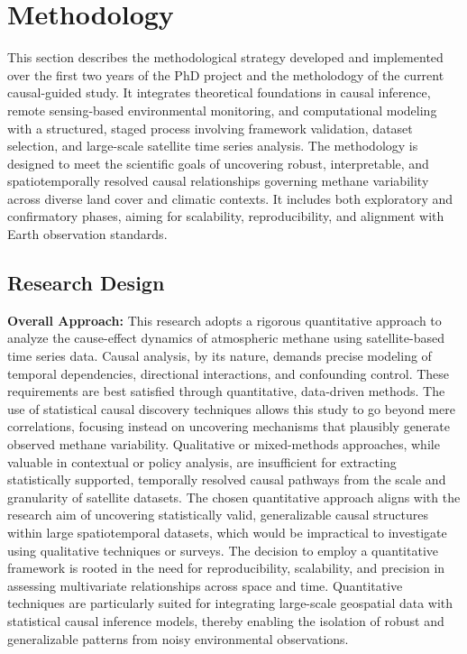 \cleardoublepage
\label{chap:methodology}


\section{Methodology}

This section describes the methodological strategy developed and implemented over the first two years of the PhD project and the metholodogy of the current causal-guided study. It integrates theoretical foundations in causal inference, remote sensing-based environmental monitoring, and computational modeling with a structured, staged process involving framework validation, dataset selection, and large-scale satellite time series analysis. The methodology is designed to meet the scientific goals of uncovering robust, interpretable, and spatiotemporally resolved causal relationships governing methane variability across diverse land cover and climatic contexts. It includes both exploratory and confirmatory phases, aiming for scalability, reproducibility, and alignment with Earth observation standards.

\subsection{Research Design}

\textbf{Overall Approach:}
This research adopts a rigorous quantitative approach to analyze the cause-effect dynamics of atmospheric methane using satellite-based time series data. Causal analysis, by its nature, demands precise modeling of temporal dependencies, directional interactions, and confounding control. These requirements are best satisfied through quantitative, data-driven methods. The use of statistical causal discovery techniques allows this study to go beyond mere correlations, focusing instead on uncovering mechanisms that plausibly generate observed methane variability. Qualitative or mixed-methods approaches, while valuable in contextual or policy analysis, are insufficient for extracting statistically supported, temporally resolved causal pathways from the scale and granularity of satellite datasets. The chosen quantitative approach aligns with the research aim of uncovering statistically valid, generalizable causal structures within large spatiotemporal datasets, which would be impractical to investigate using qualitative techniques or surveys. The decision to employ a quantitative framework is rooted in the need for reproducibility, scalability, and precision in assessing multivariate relationships across space and time. Quantitative techniques are particularly suited for integrating large-scale geospatial data with statistical causal inference models, thereby enabling the isolation of robust and generalizable patterns from noisy environmental observations.

